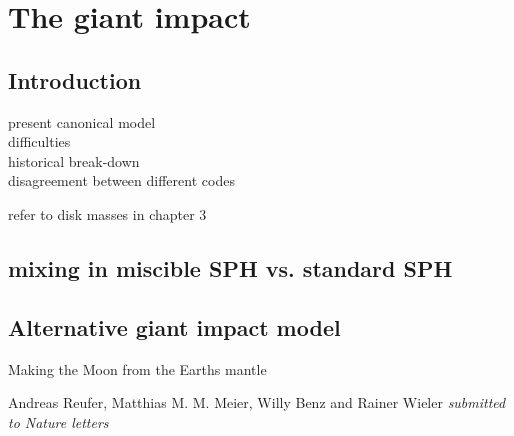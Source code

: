 \chapter{The giant impact}
\label{ch05}
\graphicspath{{./05figs/}}

\cite{Benz:1985p1755}


\section{Introduction}

present canonical model\\
difficulties\\
historical break-down\\
disagreement between different codes\\

\citep{Canup:2010p3713}

refer to disk masses in chapter 3\\

\citep{Benz:1985p1755}
\citep{Benz:1989p1893}
\citep{Cameron:2000p1854}
\citep{Canup:1996p3541}
\citep{Canup:2001p1861}
\citep{Canup:2001p3295}
\citep{Canup:2004p115}
\citep{Canup:2005p1987}
\citep{Canup:2008p3551}
\citep{Ida:1997p3395}
\citep{Pahlevan:2007p2065}

\section{mixing in miscible SPH vs. standard SPH}


\section{Alternative giant impact model}


\clearpage

Making the Moon from the Earths mantle

Andreas Reufer, Matthias M. M. Meier, Willy Benz and Rainer Wieler
\emph{submitted to Nature letters}

